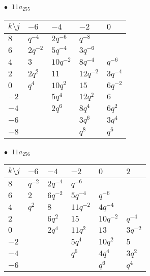 \begin{minipage}{\linewidth}
$\bullet\ $ $11a_{255}$ \vspace{0.5em} \\
\begin{tabular}{l|llll}
$k \setminus j$ & $-6$ & $-4$ & $-2$ & $0$ \\
\hline
$8$ & $q^{-4}$ & $2q^{-6}$ & $q^{-8}$ &  \\
$6$ & $2q^{-2}$ & $5q^{-4}$ & $3q^{-6}$ &  \\
$4$ & $3$ & $10q^{-2}$ & $8q^{-4}$ & $q^{-6}$ \\
$2$ & $2q^{2}$ & $11$ & $12q^{-2}$ & $3q^{-4}$ \\
$0$ & $q^{4}$ & $10q^{2}$ & $15$ & $6q^{-2}$ \\
$-2$ &  & $5q^{4}$ & $12q^{2}$ & $6$ \\
$-4$ &  & $2q^{6}$ & $8q^{4}$ & $6q^{2}$ \\
$-6$ &  &  & $3q^{6}$ & $3q^{4}$ \\
$-8$ &  &  & $q^{8}$ & $q^{6}$ \\
\end{tabular}
\vspace{2em}
\end{minipage}
%
\begin{minipage}{\linewidth}
$\bullet\ $ $11a_{256}$ \vspace{0.5em} \\
\begin{tabular}{l|lllll}
$k \setminus j$ & $-6$ & $-4$ & $-2$ & $0$ & $2$ \\
\hline
$8$ & $q^{-2}$ & $2q^{-4}$ & $q^{-6}$ &  &  \\
$6$ & $2$ & $6q^{-2}$ & $5q^{-4}$ & $q^{-6}$ &  \\
$4$ & $q^{2}$ & $8$ & $11q^{-2}$ & $4q^{-4}$ &  \\
$2$ &  & $6q^{2}$ & $15$ & $10q^{-2}$ & $q^{-4}$ \\
$0$ &  & $2q^{4}$ & $11q^{2}$ & $13$ & $3q^{-2}$ \\
$-2$ &  &  & $5q^{4}$ & $10q^{2}$ & $5$ \\
$-4$ &  &  & $q^{6}$ & $4q^{4}$ & $3q^{2}$ \\
$-6$ &  &  &  & $q^{6}$ & $q^{4}$ \\
\end{tabular}
\vspace{2em}
\end{minipage}
%
